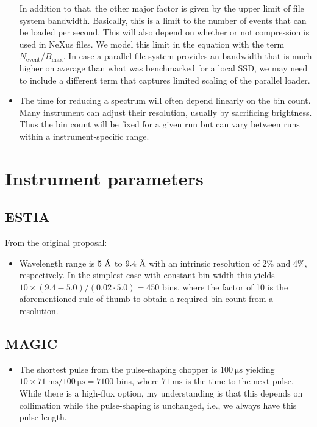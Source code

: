 \documentclass[a4paper,english,numbers=noenddot,bibliography=totoc,chapterprefix=on,DIV=12]{scrartcl}
\newcommand{\angstrom}{\textup{\AA}}
\newcommand{\Nevent}{N_{\text{event}}}
\newcommand{\Bmax}{B_{\text{max}}}
\newcommand{\estia}{ESTIA\xspace}
\newcommand{\magic}{MAGIC\xspace}
\begin{document}
\begin{itemize}
  In addition to that, the other major factor is given by the upper limit of file system bandwidth.
  Basically, this is a limit to the number of events that can be loaded per second.
  This will also depend on whether or not compression is used in NeXus files.
  We model this limit in the equation with the term $\Nevent/\Bmax$.
  In case a parallel file system provides an bandwidth that is much higher on average than what was benchmarked for a local SSD, we may need to include a different term that captures limited scaling of the parallel loader.
\item The time for reducing a spectrum will often depend linearly on the bin count.
  Many instrument can adjust their resolution, usually by sacrificing brightness.
  Thus the bin count will be fixed for a given run but can vary between runs within a instrument-specific range.
\end{itemize}

\section{Instrument parameters}

\subsection{\estia}

From the original proposal:

\begin{itemize}
  \item Wavelength range is $5~\angstrom$ to $9.4~\angstrom$ with an intrinsic resolution of 2\% and 4\%, respectively.
    In the simplest case with constant bin width this yields $10\times(9.4-5.0)/(0.02\cdot5.0) = 450$ bins, where the factor of 10 is the aforementioned rule of thumb to obtain a required bin count from a resolution.
\end{itemize}

\subsection{\magic}

\begin{itemize}
  \item The shortest pulse from the pulse-shaping chopper is $100~\mathrm{\mu s}$ yielding $10\times71~\mathrm{ms}/100~\mathrm{\mu s} = 7100$ bins, where $71~\mathrm{ms}$ is the time to the next pulse.
    While there is a high-flux option, my understanding is that this depends on collimation while the pulse-shaping is unchanged, i.e., we always have this pulse length.
\end{itemize}
\end{document}
